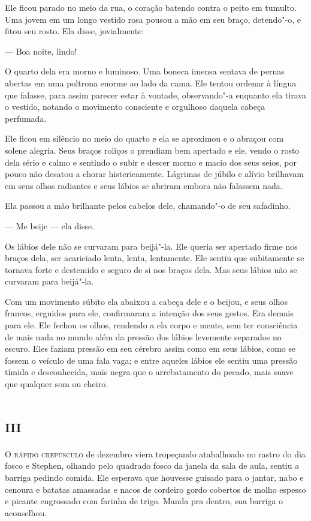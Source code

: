 Ele ficou parado no meio da rua, o coração batendo contra o peito em
tumulto. Uma jovem em um longo vestido rosa pousou a mão em seu braço,
detendo"-o, e fitou seu rosto. Ela disse, jovialmente:

 --- Boa noite, lindo!

O quarto dela era morno e luminoso. Uma boneca imensa sentava de pernas
abertas em uma poltrona enorme ao lado da cama. Ele tentou ordenar à
língua que falasse, para assim parecer estar à vontade, observando"-a
enquanto ela tirava o vestido, notando o movimento consciente e
orgulhoso daquela cabeça perfumada.

Ele ficou em silêncio no meio do quarto e ela se aproximou e o abraçou
com solene alegria. Seus braços roliços o prendiam bem apertado e ele,
vendo o rosto dela sério e calmo e sentindo o subir e descer morno e
macio dos seus seios, por pouco não desatou a chorar histericamente.
Lágrimas de júbilo e alívio brilhavam em seus olhos radiantes e seus
lábios se abriram embora não falassem nada.

Ela passou a mão brilhante pelos cabelos dele, chamando"-o de seu
safadinho.

 --- Me beije --- ela disse.

Os lábios dele não se curvaram para beijá"-la. Ele queria ser apertado
firme nos braços dela, ser acariciado lenta, lenta, lentamente. Ele
sentiu que subitamente se tornava forte e destemido e seguro de si nos
braços dela. Mas seus lábios não se curvaram para beijá"-la.

Com um movimento súbito ela abaixou a cabeça dele e o beijou, e seus
olhos francos, erguidos para ele, confirmaram a intenção dos seus
gestos. Era demais para ele. Ele fechou os olhos, rendendo a ela corpo
e mente, sem ter consciência de mais nada no mundo além da pressão dos
lábios levemente separados no escuro. Eles faziam pressão em seu
cérebro assim como em seus lábios, como se fossem o veículo de uma fala
vaga; e entre aqueles lábios ele sentiu uma pressão tímida e
desconhecida, mais negra que o arrebatamento do pecado, mais suave que
qualquer som ou cheiro.

\chapter{\textsc{iii}}

\textsc{O rápido crepúsculo} de dezembro viera tropeçando atabalhoado no rastro
do dia fosco e Stephen, olhando pelo quadrado fosco da janela da sala
de aula, sentiu a barriga pedindo comida. Ele esperava que houvesse
guisado para o jantar, nabo e cenoura e batatas amassadas e nacos de
cordeiro gordo cobertos de molho espesso e picante engrossado com
farinha de trigo. Manda pra dentro, sua barriga o aconselhou.

